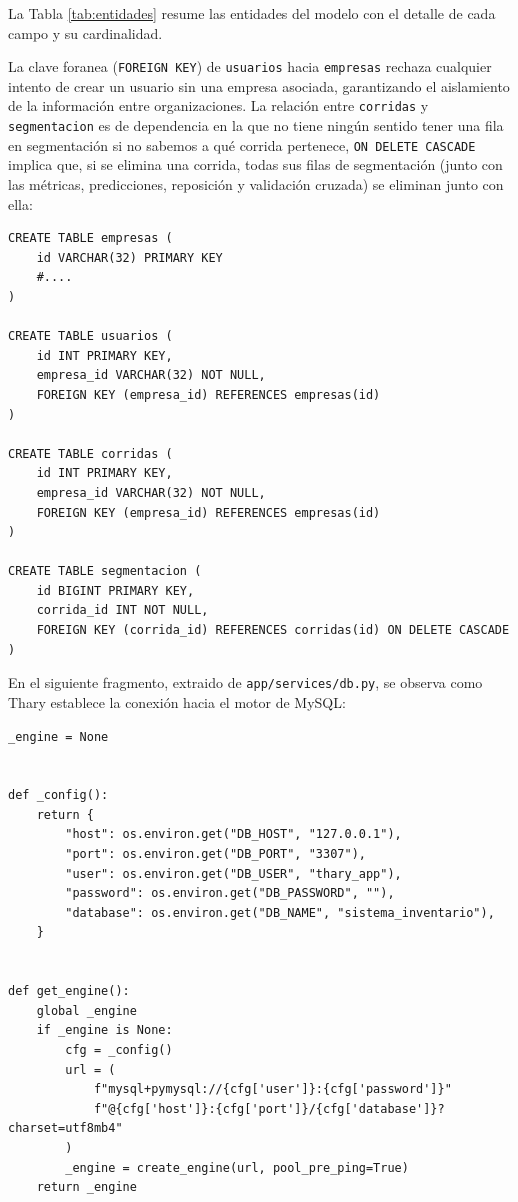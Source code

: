La Tabla \ref{tab:entidades} resume las entidades del modelo con el detalle de cada campo y su cardinalidad.

La clave foranea (\texttt{FOREIGN KEY}) de \texttt{usuarios} hacia \texttt{empresas} rechaza cualquier intento de crear un usuario sin una empresa asociada, garantizando el aislamiento de la información entre organizaciones. La relación entre \texttt{corridas} y \texttt{segmentacion} es de dependencia en la que no tiene ningún sentido tener una fila en segmentación si no sabemos a qué corrida pertenece, \texttt{ON DELETE CASCADE} implica que, si se elimina una corrida, todas sus filas de segmentación (junto con las métricas, predicciones, reposición y validación cruzada) se eliminan junto con ella:

\label{lst:sql_tablas}
\begin{verbatim}
CREATE TABLE empresas (
    id VARCHAR(32) PRIMARY KEY
    #....
)

CREATE TABLE usuarios (
    id INT PRIMARY KEY,
    empresa_id VARCHAR(32) NOT NULL,
    FOREIGN KEY (empresa_id) REFERENCES empresas(id)
)

CREATE TABLE corridas (
    id INT PRIMARY KEY,
    empresa_id VARCHAR(32) NOT NULL,
    FOREIGN KEY (empresa_id) REFERENCES empresas(id)
)

CREATE TABLE segmentacion (
    id BIGINT PRIMARY KEY,
    corrida_id INT NOT NULL,
    FOREIGN KEY (corrida_id) REFERENCES corridas(id) ON DELETE CASCADE
)
\end{verbatim}

En el siguiente fragmento, extraido de \texttt{app/services/db.py}, se observa como Thary establece la conexión hacia el motor de MySQL:

\label{lst:conexion_mysql}
\begin{verbatim}
_engine = None


def _config():
    return {
        "host": os.environ.get("DB_HOST", "127.0.0.1"),
        "port": os.environ.get("DB_PORT", "3307"),
        "user": os.environ.get("DB_USER", "thary_app"),
        "password": os.environ.get("DB_PASSWORD", ""),
        "database": os.environ.get("DB_NAME", "sistema_inventario"),
    }


def get_engine():
    global _engine
    if _engine is None:
        cfg = _config()
        url = (
            f"mysql+pymysql://{cfg['user']}:{cfg['password']}"
            f"@{cfg['host']}:{cfg['port']}/{cfg['database']}?charset=utf8mb4"
        )
        _engine = create_engine(url, pool_pre_ping=True)
    return _engine
\end{verbatim}

